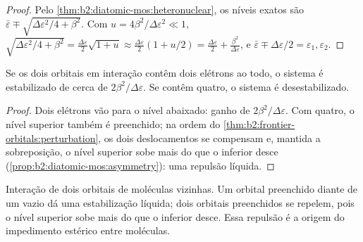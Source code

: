 \begin{proof}
Pelo \cref{thm:b2:diatomic-mos:heteronuclear}, os níveis exatos são $\bar\varepsilon \mp
\sqrt{\Delta\varepsilon^2/4 + \beta^2}$. Com $u = 4\beta^2/\Delta\varepsilon^2 \ll 1$, $\sqrt{\Delta\varepsilon^2/4
+ \beta^2} = \frac{\Delta\varepsilon}{2}\sqrt{1 + u} \approx \frac{\Delta\varepsilon}{2}(1 + u/2) =
\frac{\Delta\varepsilon}{2} + \frac{\beta^2}{\Delta\varepsilon}$, e $\bar\varepsilon \mp \Delta\varepsilon/2 = \varepsilon_1,
\varepsilon_2$.
\end{proof}

\begin{proposition}\label{prop:b2:frontier-orbitals:four-electron}
Se os dois orbitais em interação contêm dois elétrons ao todo, o sistema é
estabilizado de cerca de $2\beta^2/\Delta\varepsilon$. Se contêm quatro, o sistema é desestabilizado.
\end{proposition}

\begin{proof}
Dois elétrons vão para o nível abaixado: ganho de $2\beta^2/\Delta\varepsilon$. Com quatro, o nível
superior também é preenchido; na ordem do \cref{thm:b2:frontier-orbitals:perturbation}, os
dois deslocamentos se compensam e, mantida a sobreposição, o nível superior
sobe mais do que o inferior desce (\cref{prop:b2:diatomic-mos:asymmetry}): uma
repulsão líquida.
\end{proof}

\begin{omfigure}

{\small Interação de dois orbitais de moléculas vizinhas. Um orbital
preenchido diante de um vazio dá uma estabilização líquida; dois orbitais
preenchidos se repelem, pois o nível superior sobe mais do que o inferior
desce. Essa repulsão é a origem do impedimento estérico entre moléculas.}
\end{omfigure}

